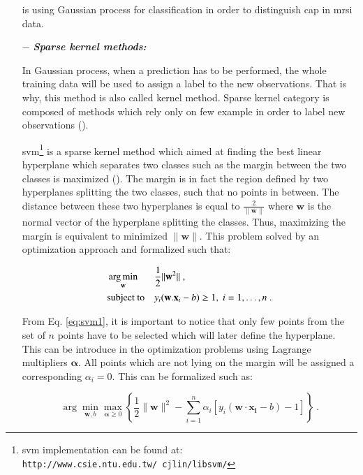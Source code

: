 \begin{enumerate}[leftmargin=*]
\cite{Kelm2007} is using Gaussian process for classification in order to distinguish \ac{cap} in \ac{mrsi} data.

\item[$-$] \textbf{\textit{Sparse kernel methods:}}

In Gaussian process, when a prediction has to be performed, the whole training data will be used to assign a label to the new observations. That is why, this method is also called kernel method. Sparse kernel category is composed of methods which rely only on few example in order to label new observations (\cite{Bishop2006}).

\Acf{svm}\footnote{\ac{svm} implementation can be found at: \texttt{http://www.csie.ntu.edu.tw/\allowbreak ~cjlin/libsvm/}} is a sparse kernel method which aimed at finding the best linear hyperplane which separates two classes such as the margin between the two classes is maximized (\cite{Vapnik1963}). The margin is in fact the region defined by two hyperplanes splitting the two classes, such that no points in between. The distance between these two hyperplanes is equal to $\frac{2}{\|\mathbf{w}\|}$ where $\mathbf{w}$ is the normal vector of the hyperplane splitting the classes. Thus, maximizing the margin is equivalent to minimized $\|\mathbf{w}\|$. This problem solved by an optimization approach and formalized such that:

\begin{equation}
\begin{aligned}
& \operatorname*{arg\,min}_{\mathbf{w}}
& & \frac{1}{2} \| \mathbf{w}^2\| \ , \\
& \text{subject to}
& & y_i(\mathbf{w}.\mathbf{x}_i - b) \geq 1, \; i = 1, \ldots, n \ .
\end{aligned}
\label{eq:svm1}
\end{equation}

From Eq. \ref{eq:svm1}, it is important to notice that only few points from the set of $n$ points have to be selected which will later define the hyperplane. This can be introduce in the optimization problems using Lagrange multipliers $\boldsymbol{\alpha}$. All points which are not lying on the margin will be assigned a corresponding $\alpha_i = 0$. This can be formalized such as:

\begin{equation}
	\arg\min_{\mathbf{w},b } \max_{\boldsymbol{\alpha}\geq 0 } \left\{ \frac{1}{2}\|\mathbf{w}\|^2 - \sum_{i=1}^{n}{\alpha_i[y_i(\mathbf{w}\cdot \mathbf{x_i} - b)-1]} \right\} \ .
	\label{eq:svm2}
\end{equation}


\end{enumerate}
